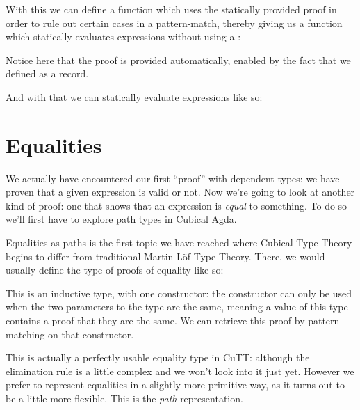With this we can define a function which uses the statically provided proof in
order to rule out certain cases in a pattern-match, thereby giving us a function
which statically evaluates expressions without using a :
\begin{agdalisting}
\end{agdalisting}
Notice here that the  proof is provided automatically,
enabled by the fact that we defined \agdatop as a record.

And with that we can statically evaluate expressions like so:
\begin{agdalisting} \label{example-static-eval}
\end{agdalisting}
\section{Equalities}
We actually have encountered our first ``proof'' with dependent types: we have
proven that a given expression is valid or not.
Now we're going to look at another kind of proof: one that shows that an
expression is \emph{equal} to something.
To do so we'll first have to explore path types in Cubical Agda.

Equalities as paths is the first topic we have reached where Cubical Type Theory
begins to differ from traditional Martin-Löf Type Theory.
There, we would usually define the type of proofs of equality like so:
\begin{agdalisting}
\end{agdalisting}
This is an inductive  type, with one constructor: the
constructor can only be used when the two parameters to the type are the same,
meaning a value of this type contains a proof that they are the same.
We can retrieve this proof by pattern-matching on that constructor.

This is actually a perfectly usable equality type in CuTT: although the
elimination rule is a little complex and we won't look into it just yet.
However we prefer to represent equalities in a slightly more primitive way, as
it turns out to be a little more flexible.
This is the \emph{path} representation.

